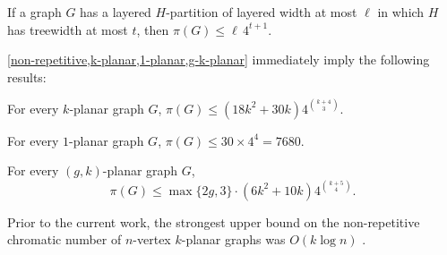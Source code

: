 \documentclass{patmorin}
\newcommand{\note}[2]{{\color{red}[#1:~#2]}}
\renewcommand{\ge}{\geqslant}
\renewcommand{\le}{\leqslant}
\begin{document}

\begin{lem}
\label{non-repetitive}
If a graph $G$ has a layered $H$-partition of layered width at most $\ell$ in which $H$ has treewidth at most $t$, then $\pi(G)\le \ell\, 4^{t+1}$.
\end{lem}


\cref{non-repetitive,k-planar,1-planar,g-k-planar} immediately imply the following results:


\begin{cor}
  For every $k$-planar graph $G$, 
  $\pi(G)\le (18k^2 + 30k) 4^{\binom{k+4}{3}}$.
\end{cor}

\begin{cor}
  For every $1$-planar graph $G$, $\pi(G)\le 30\times 4^4=7680$. 
\end{cor}

\begin{cor}
  For every $(g,k)$-planar graph $G$, 
  \[ 
    \pi(G)\le \max\{2g,3\}\cdot(6k^2 + 10k) 4^{\binom{k+5}{4}}. 
     \]
\end{cor}



Prior to the current work, the strongest upper bound on the non-repetitive chromatic number of $n$-vertex  $k$-planar graphs was $O(k\log n)$ \cite{dujmovic.morin.ea:layered}.
\end{document}

